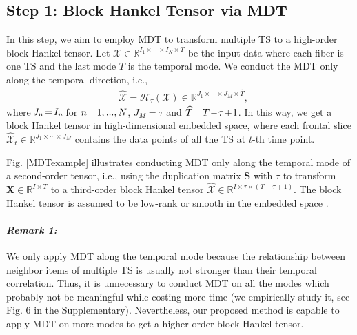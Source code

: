 \documentclass[letterpaper]{article} %
\numberwithin{theorem}{section}
\newcommand{\ten}[1]{ \boldsymbol{\mathcal #1}}
\newcommand{\bbR}[1]{\mathbb{R}^{#1}}
\begin{document}
\subsection{Step 1: Block Hankel Tensor via  MDT}

In this step, we  aim to employ MDT to transform multiple  TS  to  a   high-order block Hankel tensor.     Let $\ten{X} \in \bbR{I_1 \times \cdots \times I_N\times T}$ be the input  data where  each fiber  is one TS and  the last mode $T$ is the temporal mode.  We conduct the MDT only along the temporal direction, i.e.,
\begin{equation}\label{MDTforX}
\begin{aligned}
&{\widehat{\ten{X}}} = \mathcal{H}_{\tau} (\ten{X}) \in \bbR{J_1 \times \cdots \times J_M \times \widehat{T}},
\end{aligned}
\end{equation}
where $\hspace{-0.05cm} J_n\hspace{-0.05cm} =\hspace{-0.05cm}I_n\hspace{-0.05cm}$  for  $n\hspace{-0.05cm}=\hspace{-0.05cm}1, ...,N$, $J_M=\tau$ and  $\widehat{T} \hspace{-0.05cm} = \hspace{-0.05cm} T \hspace{-0.05cm} -\hspace{-0.05cm} \tau\hspace{-0.05cm}  + \hspace{-0.05cm}1$. In this way, we get a block Hankel tensor in   high-dimensional embedded space, where each frontal slice  ${\widehat{\ten{X}}_t} \in \bbR{J_1 \times \cdots \times J_M}$ contains  the data points of all the TS  at $t$-th time point.

Fig. \ref{MDTexample} illustrates   conducting  MDT only along the temporal mode of a second-order tensor, i.e.,  using the duplication matrix  $\mathbf S$ with $\tau$ to transform   $\mathbf{X} \in \bbR{I \times T}$ to  a third-order block Hankel tensor $\widehat{\ten{X}  } \in \bbR{I \times  \tau \times {(T-\tau+1)} }$.    The  block Hankel tensor is assumed to be  low-rank  or smooth in the embedded space \cite{yokota2018missing}.







\paragraph{\textit{Remark 1:}}   We   only apply MDT along the temporal mode because   the   relationship  between neighbor  items  of multiple TS    is usually not  stronger than their temporal correlation.  Thus, it is unnecessary to conduct MDT on all the modes   which probably not be meaningful while costing  more time (we  empirically study it, see Fig. 6 in the Supplementary). Nevertheless, our proposed method is capable to apply MDT on more modes to get a higher-order block Hankel tensor.
\end{document}
